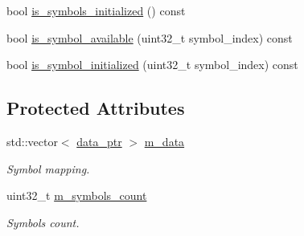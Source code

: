 \begin{DoxyCompactItemize}
\begin{DoxyCompactList}\small\item\em \end{DoxyCompactList}\item 
bool \hyperlink{classkodo_1_1shallow__symbol__storage_a992d51a438488e06f31b8fabbda5dae9}{is\-\_\-symbols\-\_\-initialized} () const 
\begin{DoxyCompactList}\small\item\em \end{DoxyCompactList}\item 
bool \hyperlink{classkodo_1_1shallow__symbol__storage_a44fab4ff09fc4cf7f59801d5f4a05181}{is\-\_\-symbol\-\_\-available} (uint32\-\_\-t symbol\-\_\-index) const 
\begin{DoxyCompactList}\small\item\em \end{DoxyCompactList}\item 
bool \hyperlink{classkodo_1_1shallow__symbol__storage_a5f426aebe0416805b96cd838c206f60f}{is\-\_\-symbol\-\_\-initialized} (uint32\-\_\-t symbol\-\_\-index) const 
\begin{DoxyCompactList}\small\item\em \end{DoxyCompactList}\end{DoxyCompactItemize}
\subsection*{Protected Attributes}
\begin{DoxyCompactItemize}
\item 
\hypertarget{classkodo_1_1shallow__symbol__storage_ab69749c565ccb7149010a67e8e3612f2}{std\-::vector$<$ \hyperlink{classkodo_1_1shallow__symbol__storage_ae30b89454fcd5e9d9afd516ffc103753}{data\-\_\-ptr} $>$ \hyperlink{classkodo_1_1shallow__symbol__storage_ab69749c565ccb7149010a67e8e3612f2}{m\-\_\-data}}\label{classkodo_1_1shallow__symbol__storage_ab69749c565ccb7149010a67e8e3612f2}

\begin{DoxyCompactList}\small\item\em Symbol mapping. \end{DoxyCompactList}\item 
\hypertarget{classkodo_1_1shallow__symbol__storage_a6a2c3618cfbccf9c302e85366205a172}{uint32\-\_\-t \hyperlink{classkodo_1_1shallow__symbol__storage_a6a2c3618cfbccf9c302e85366205a172}{m\-\_\-symbols\-\_\-count}}\label{classkodo_1_1shallow__symbol__storage_a6a2c3618cfbccf9c302e85366205a172}

\begin{DoxyCompactList}\small\item\em Symbols count. \end{DoxyCompactList}\end{DoxyCompactItemize}


